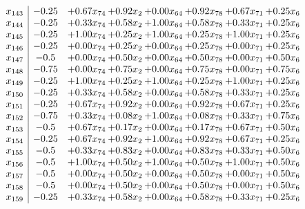 \documentclass[8pt]{article}
\begin{document}
\[\begin{array}{c| c c@{\hskip 2pt} c@{\hskip 2pt} c@{\hskip 2pt} c@{\hskip 2pt} c@{\hskip 2pt} c@{\hskip 2pt} }
 x_{143}   &  -0.25 & +  0.67 x_{74} & +  0.92 x_{2} & +  0.00 x_{64} & +  0.92 x_{78} & +  0.67 x_{71} & +  0.25 x_{6}\\
 x_{144}   &  -0.25 & +  0.33 x_{74} & +  0.58 x_{2} & +  1.00 x_{64} & +  0.58 x_{78} & +  0.33 x_{71} & +  0.25 x_{6}\\
 x_{145}   &  -0.25 & +  1.00 x_{74} & +  0.25 x_{2} & +  1.00 x_{64} & +  0.25 x_{78} & +  1.00 x_{71} & +  0.25 x_{6}\\
 x_{146}   &  -0.25 & +  0.00 x_{74} & +  0.25 x_{2} & +  0.00 x_{64} & +  0.25 x_{78} & +  0.00 x_{71} & +  0.25 x_{6}\\
 x_{147}   &  -0.5 & +  0.00 x_{74} & +  0.50 x_{2} & +  0.00 x_{64} & +  0.50 x_{78} & +  0.00 x_{71} & +  0.50 x_{6}\\
 x_{148}   &  -0.75 & +  0.00 x_{74} & +  0.75 x_{2} & +  0.00 x_{64} & +  0.75 x_{78} & +  0.00 x_{71} & +  0.75 x_{6}\\
 x_{149}   &  -0.25 & +  1.00 x_{74} & +  0.25 x_{2} & +  1.00 x_{64} & +  0.25 x_{78} & +  1.00 x_{71} & +  0.25 x_{6}\\
 x_{150}   &  -0.25 & +  0.33 x_{74} & +  0.58 x_{2} & +  0.00 x_{64} & +  0.58 x_{78} & +  0.33 x_{71} & +  0.25 x_{6}\\
 x_{151}   &  -0.25 & +  0.67 x_{74} & +  0.92 x_{2} & +  0.00 x_{64} & +  0.92 x_{78} & +  0.67 x_{71} & +  0.25 x_{6}\\
 x_{152}   &  -0.75 & +  0.33 x_{74} & +  0.08 x_{2} & +  1.00 x_{64} & +  0.08 x_{78} & +  0.33 x_{71} & +  0.75 x_{6}\\
 x_{153}   &  -0.5 & +  0.67 x_{74} & +  0.17 x_{2} & +  0.00 x_{64} & +  0.17 x_{78} & +  0.67 x_{71} & +  0.50 x_{6}\\
 x_{154}   &  -0.25 & +  0.67 x_{74} & +  0.92 x_{2} & +  1.00 x_{64} & +  0.92 x_{78} & +  0.67 x_{71} & +  0.25 x_{6}\\
 x_{155}   &  -0.5 & +  0.33 x_{74} & +  0.83 x_{2} & +  0.00 x_{64} & +  0.83 x_{78} & +  0.33 x_{71} & +  0.50 x_{6}\\
 x_{156}   &  -0.5 & +  1.00 x_{74} & +  0.50 x_{2} & +  1.00 x_{64} & +  0.50 x_{78} & +  1.00 x_{71} & +  0.50 x_{6}\\
 x_{157}   &  -0.5 & +  0.00 x_{74} & +  0.50 x_{2} & +  0.00 x_{64} & +  0.50 x_{78} & +  0.00 x_{71} & +  0.50 x_{6}\\
 x_{158}   &  -0.5 & +  0.00 x_{74} & +  0.50 x_{2} & +  0.00 x_{64} & +  0.50 x_{78} & +  0.00 x_{71} & +  0.50 x_{6}\\
 x_{159}   &  -0.25 & +  0.33 x_{74} & +  0.58 x_{2} & +  0.00 x_{64} & +  0.58 x_{78} & +  0.33 x_{71} & +  0.25 x_{6}\\

\end{array}\]
\end{document}
